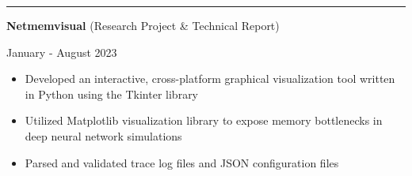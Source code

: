 \documentclass[letter]{article}
\begin{document}
    \hrule
    \vspace{4pt}
    \noindent
    \begin{minipage}[c]{0.7\linewidth}
        \noindent \textbf{Netmemvisual} (Research Project \& Technical Report)
    \end{minipage}
    \begin{minipage}[c]{0.291\linewidth}
        \begin{flushright}
            January - August 2023
        \end{flushright}
    \end{minipage}
    \noindent
    \begin{itemize}[noitemsep, topsep=0pt]
        \item Developed an interactive, cross-platform graphical visualization tool written in Python using the Tkinter library
        \item Utilized Matplotlib visualization library to expose memory bottlenecks in deep neural network simulations
        \item Parsed and validated trace log files and JSON configuration files
    \end{itemize}
    \medskip
\end{document}
